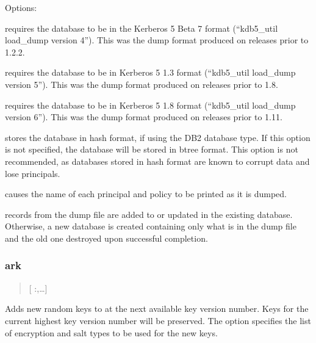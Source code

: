 \documentclass[letterpaper,10pt,english]{sphinxmanual}
\begin{document}
\sphinxAtStartPar
Options:
\begin{description}
\sphinxAtStartPar
requires the database to be in the Kerberos 5 Beta 7 format
(“kdb5\_util load\_dump version 4”).  This was the dump format
produced on releases prior to 1.2.2.

\sphinxAtStartPar
requires the database to be in Kerberos 5 1.3 format (“kdb5\_util
load\_dump version 5”).  This was the dump format produced on
releases prior to 1.8.

\sphinxAtStartPar
requires the database to be in Kerberos 5 1.8 format (“kdb5\_util
load\_dump version 6”).  This was the dump format produced on
releases prior to 1.11.

\sphinxAtStartPar
stores the database in hash format, if using the DB2 database
type.  If this option is not specified, the database will be
stored in btree format.  This option is not recommended, as
databases stored in hash format are known to corrupt data and lose
principals.

\sphinxAtStartPar
causes the name of each principal and policy to be printed as it
is dumped.

\sphinxAtStartPar
records from the dump file are added to or updated in the existing
database.  Otherwise, a new database is created containing only
what is in the dump file and the old one destroyed upon successful
completion.

\end{description}


\subsubsection{ark}
\label{\detokenize{admin/admin_commands/kdb5_util:ark}}\label{\detokenize{admin/admin_commands/kdb5_util:kdb5-util-load-end}}\begin{quote}

\sphinxAtStartPar
{} {[} :,…{]} 
\end{quote}

\sphinxAtStartPar
Adds new random keys to  at the next available key version
number.  Keys for the current highest key version number will be
preserved.  The  option specifies the list of encryption and
salt types to be used for the new keys.
\end{document}
